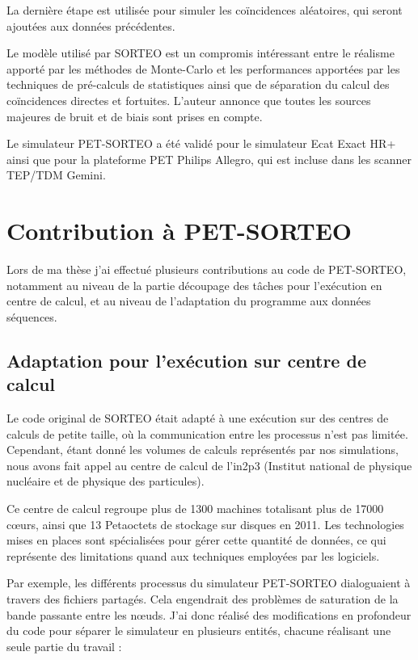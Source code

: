 La dernière étape est utilisée pour simuler les coïncidences aléatoires, qui seront ajoutées aux données précédentes.


Le modèle utilisé par SORTEO est un compromis intéressant entre le réalisme apporté par les méthodes de Monte-Carlo et les performances apportées par les techniques de pré-calculs de statistiques ainsi que de séparation du calcul des coïncidences directes et fortuites. L'auteur annonce que toutes les sources majeures de bruit et de biais sont prises en compte.

Le simulateur PET-SORTEO a été validé pour le simulateur Ecat Exact HR+~\cite{reilhac2004pet} ainsi que pour la plateforme PET Philips Allegro, qui est incluse dans les scanner TEP/TDM Gemini.


	\section{Contribution à PET-SORTEO}

Lors de ma thèse j'ai effectué plusieurs contributions au code de PET-SORTEO, notamment au niveau de la partie découpage des tâches pour l'exécution en centre de calcul, et au niveau de l'adaptation du programme aux données séquences.

\subsection{Adaptation pour l'exécution sur centre de calcul}

Le code original de SORTEO était adapté à une exécution sur des centres de calculs de petite taille, où la communication entre les processus n’est pas limitée. Cependant, étant donné les volumes de calculs représentés par nos simulations, nous avons fait appel au centre de calcul de l'in2p3 (Institut national de physique nucléaire et de physique des particules).

Ce centre de calcul regroupe plus de 1300 machines totalisant plus de 17000 cœurs, ainsi que 13 Petaoctets de stockage sur disques en 2011. Les technologies mises en places sont spécialisées pour gérer cette quantité de données, ce qui représente des limitations quand aux techniques employées par les logiciels.

Par exemple, les différents processus du simulateur PET-SORTEO dialoguaient à travers des fichiers partagés. Cela engendrait des problèmes de saturation de la bande passante entre les nœuds. J'ai donc réalisé des modifications en profondeur du code pour séparer le simulateur en plusieurs entités, chacune réalisant une seule partie du travail :


